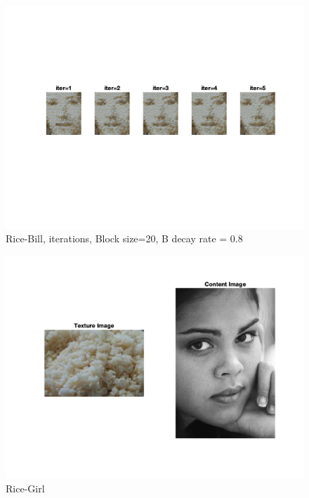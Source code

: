\documentclass[10pt,twocolumn,letterpaper]{article}
\begin{document}
\begin{figure}[h]
    \begin{center}
    \includegraphics[trim={2cm 6cm 2cm 4cm}, clip, scale=0.9]{../results/iters/res_rice_bill_b_20_bdr_0_800000.png}
    \end{center}
    \vspace{-0.2em}
    \caption{Rice-Bill, iterations, Block size=20, B decay rate = 0.8}
    \label{fig:rice_bill_iter}
\end{figure}

\begin{figure}[h]
    \begin{center}
    \includegraphics[trim={2cm 4cm 2cm 2cm}, clip, scale=0.5]{../results/bsize/inp_rice_girl.png}
    \end{center}
    \vspace{-0.2em}
    \caption{Rice-Girl}
    \label{fig:rice_girl}
\end{figure}
\end{document}
